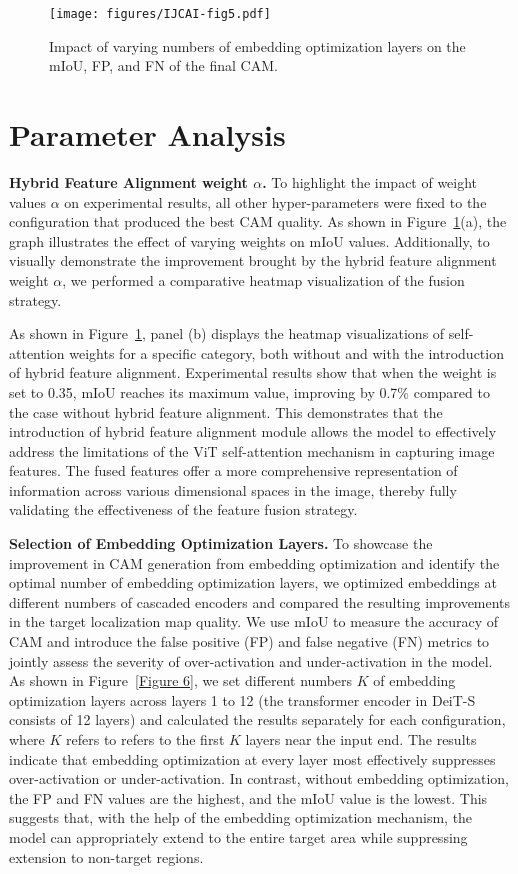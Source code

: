     \begin{figure}[H]
    \centering
    \texttt{[image: figures/IJCAI-fig5.pdf]}  
    \caption{Impact of varying numbers of embedding optimization layers on the mIoU, FP, and FN of the final CAM.}
    \label{Figure 5}
    \end{figure}
    
\section{Parameter Analysis}

    \textbf{Hybrid Feature Alignment weight \( \alpha \).} To highlight the impact of weight values \( \alpha \) on experimental results, all other hyper-parameters were fixed to the configuration that produced the best CAM quality. As shown in Figure~\ref{Figure 5}(a), the graph illustrates the effect of varying weights on mIoU values. Additionally, to visually demonstrate the improvement brought by the hybrid feature alignment weight \( \alpha \), we performed a comparative heatmap visualization of the fusion strategy. 
    
    
    
    As shown in Figure~\ref{Figure 5}, panel (b) displays the heatmap visualizations of self-attention weights for a specific category, both without and with the introduction of hybrid feature alignment. Experimental results show that when the weight is set to 0.35, mIoU reaches its maximum value, improving by 0.7\% compared to the case without hybrid feature alignment. This demonstrates that the introduction of hybrid feature alignment module allows the model to effectively address the limitations of the ViT self-attention mechanism in capturing image features. The fused features offer a more comprehensive representation of information across various dimensional spaces in the image, thereby fully validating the effectiveness of the feature fusion strategy.
    
    \textbf{Selection of Embedding Optimization Layers.} To showcase the improvement in CAM generation from embedding optimization and identify the optimal number of embedding optimization layers, we optimized embeddings at different numbers of cascaded encoders and compared the resulting improvements in the target localization map quality. We use mIoU to measure the accuracy of CAM and introduce the false positive (FP) and false negative (FN) metrics to jointly assess the severity of over-activation and under-activation in the model. As shown in Figure~\ref{Figure 6}, we set different numbers \( K\) of embedding optimization layers across layers 1 to 12 (the transformer encoder in DeiT-S consists of 12 layers) and calculated the results separately for each configuration, where \( K\) refers to refers to the first \( K\) layers near the input end. The results indicate that embedding optimization at every layer most effectively suppresses over-activation or under-activation. In contrast, without embedding optimization, the FP and FN values are the highest, and the mIoU value is the lowest. This suggests that, with the help of the embedding optimization mechanism, the model can appropriately extend to the entire target area while suppressing extension to non-target regions.
    
